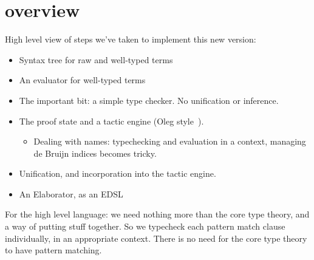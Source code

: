 \section{overview}

High level view of steps we've taken to implement this new version:

\begin{itemize}
\item Syntax tree for raw and well-typed terms
\item An evaluator for well-typed terms
\item The important bit: a simple type checker. No unification or
  inference.
\item The proof state and a tactic engine (Oleg style~\cite{mcbride-thesis}).
\begin{itemize}
  \item Dealing with names: typechecking and evaluation in a context, managing de Bruijn
        indices becomes tricky.
\end{itemize}
\item Unification, and incorporation into the tactic engine.
\item An Elaborator, as an EDSL
\end{itemize}

For the high level language: we need nothing more than the core type theory,
and a way of putting stuff together. So we typecheck each pattern match clause
individually, in an appropriate context. There is no need for the core type
theory to have pattern matching.
